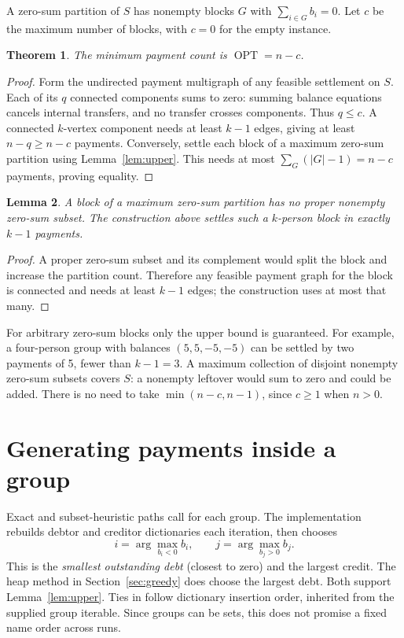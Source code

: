 \documentclass[11pt]{article}
\newtheorem{theorem}{Theorem}[section]
\newtheorem{lemma}[theorem]{Lemma}
\begin{document}
A zero-sum partition of $S$ has nonempty blocks $G$ with
$\sum_{i\in G}b_i=0$. Let $c$ be the maximum number of blocks, with
$c=0$ for the empty instance.
\begin{theorem}\label{thm:optimum}
The minimum payment count is $\operatorname{OPT}=n-c$.
\end{theorem}
\begin{proof}
Form the undirected payment multigraph of any feasible settlement on $S$.
Each of its $q$ connected components sums to zero: summing balance
equations cancels internal transfers, and no transfer crosses components.
Thus $q\leq c$. A connected $k$-vertex component needs at least $k-1$
edges, giving at least $n-q\geq n-c$ payments.
Conversely, settle each block of a maximum zero-sum partition using
Lemma~\ref{lem:upper}. This needs at most
$\sum_G(|G|-1)=n-c$ payments, proving equality.
\end{proof}
\begin{lemma}\label{lem:indecomposable}
A block of a maximum zero-sum partition has no proper nonempty zero-sum
subset. The construction above settles such a $k$-person block in exactly
$k-1$ payments.
\end{lemma}
\begin{proof}
A proper zero-sum subset and its complement would split the block and
increase the partition count. Therefore any feasible payment graph for
the block is connected and needs at least $k-1$ edges; the construction
uses at most that many.
\end{proof}
For arbitrary zero-sum blocks only the upper bound is guaranteed.
For example, a four-person group with balances $(5,5,-5,-5)$ can be
settled by two payments of 5, fewer than $k-1=3$.
A maximum collection of disjoint nonempty zero-sum subsets covers $S$:
a nonempty leftover would sum to zero and could be added. There is no need
to take $\min(n-c,n-1)$, since $c\geq1$ when $n>0$.

\section{Generating payments inside a group}\label{sec:group}
Exact and subset-heuristic paths call  for each group.
The implementation rebuilds debtor and creditor dictionaries each
iteration, then chooses
\[
 i=\arg\max_{b_i<0}b_i,\qquad j=\arg\max_{b_j>0}b_j.
\]
This is the \emph{smallest outstanding debt} (closest to zero) and the
largest credit. The heap method in Section~\ref{sec:greedy}
does choose the largest debt. Both support Lemma~\ref{lem:upper}.
Ties in  follow dictionary insertion order, inherited from
the supplied group iterable. Since groups can be sets, this does not
promise a fixed name order across runs.
\end{document}
